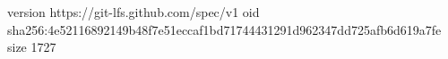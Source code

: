 version https://git-lfs.github.com/spec/v1
oid sha256:4e52116892149b48f7e51eccaf1bd71744431291d962347dd725afb6d619a7fe
size 1727
